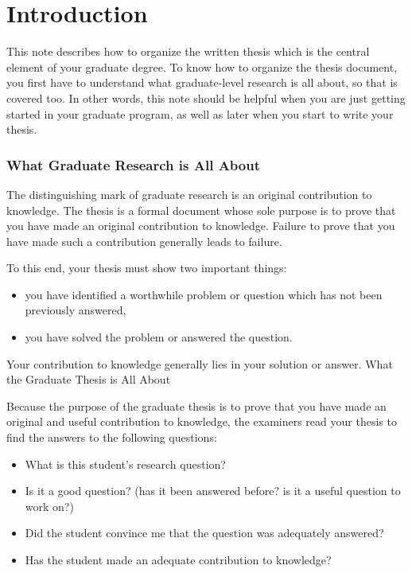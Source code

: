 \chapter{Introduction}
\label{chap:introduction}
This note describes how to organize the written thesis which is the central
element of your graduate degree. To know how to organize the thesis document,
you first have to understand what graduate-level research is all about, so
that is covered too. In other words, this note should be helpful when you are
just getting started in your graduate program, as well as later when you start
to write your thesis.

\subsection{What Graduate Research is All About}
The distinguishing mark of graduate research is an original contribution to
knowledge. The thesis is a formal document whose sole purpose is to prove that
you have made an original contribution to knowledge. Failure to prove that you
have made such a contribution generally leads to failure.

To this end, your thesis must show two important things:

\begin{itemize}
    \item you have identified a worthwhile problem or question which has not been previously answered,
    \item you have solved the problem or answered the question.
\end{itemize}

Your contribution to knowledge generally lies in your solution or answer.
What the Graduate Thesis is All About

Because the purpose of the graduate thesis is to prove that you have made an
original and useful contribution to knowledge, the examiners read your thesis
to find the answers to the following questions:

\begin{itemize}
    \item What is this student's research question?
    \item Is it a good question? (has it been answered before? is it a useful question to work on?)
    \item Did the student convince me that the question was adequately answered?
    \item Has the student made an adequate contribution to knowledge?
\end{itemize}

